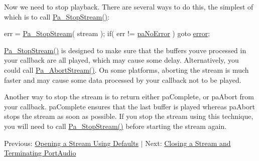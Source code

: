 Now we need to stop playback. There are several ways to do this, the simplest of which is to call \hyperlink{portaudio_8h_af18dd60220251286c337631a855e38a0}{Pa\+\_\+\+Stop\+Stream()}\+:


\begin{DoxyCode}
err = \hyperlink{portaudio_8h_af18dd60220251286c337631a855e38a0}{Pa\_StopStream}( stream );
\textcolor{keywordflow}{if}( err != \hyperlink{portaudio_8h_a2e45bf8b5145f131a91c128af2bdaec7aeb09d15a48b6c1034728a9c518cfe4ba}{paNoError} ) \textcolor{keywordflow}{goto} \hyperlink{sndfile__load_8m_a3a81ee160b23b01b04b7c08b35123218}{error};
\end{DoxyCode}


\hyperlink{portaudio_8h_af18dd60220251286c337631a855e38a0}{Pa\+\_\+\+Stop\+Stream()} is designed to make sure that the buffers you\textquotesingle{}ve processed in your callback are all played, which may cause some delay. Alternatively, you could call \hyperlink{portaudio_8h_a138e57abde4e833c457b64895f638a25}{Pa\+\_\+\+Abort\+Stream()}. On some platforms, aborting the stream is much faster and may cause some data processed by your callback not to be played.

Another way to stop the stream is to return either pa\+Complete, or pa\+Abort from your callback. pa\+Complete ensures that the last buffer is played whereas pa\+Abort stops the stream as soon as possible. If you stop the stream using this technique, you will need to call \hyperlink{portaudio_8h_af18dd60220251286c337631a855e38a0}{Pa\+\_\+\+Stop\+Stream()} before starting the stream again.

Previous\+: \hyperlink{open_default_stream}{Opening a Stream Using Defaults} $\vert$ Next\+: \hyperlink{terminating_portaudio}{Closing a Stream and Terminating Port\+Audio} 